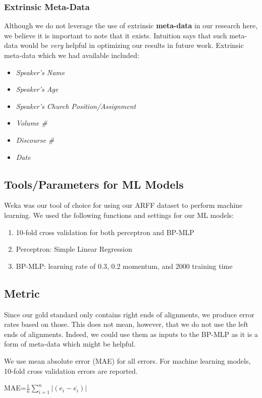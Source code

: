 \subsubsection{Extrinsic Meta-Data}
Although we do not leverage the use of extrinsic \textbf{meta-data} in our research here, we believe it is important to note that it exists. Intuition says that such meta-data would be \textit{very} helpful in optimizing our results in future work. Extrinsic meta-data which we had available included:
	\begin{itemize}
		\item \textit{Speaker's Name}
		\item \textit{Speaker's Age}
		\item \textit{Speaker's Church Position/Assignment}
		\item \textit{Volume \#}
		\item \textit{Discourse \#}
		\item \textit{Date}
	\end{itemize}

\subsection{Tools/Parameters for ML Models}
Weka \cite{weka_2009} was our tool of choice for using our ARFF dataset to perform machine learning. We used the following functions and settings for our ML models:
\begin{enumerate}
	\item 10-fold cross validation for both perceptron and BP-MLP
	\item Perceptron: Simple Linear Regression
	\item BP-MLP: learning rate of 0.3, 0.2 momentum, and 2000 training time
\end{enumerate}

\subsection{Metric}
Since our gold standard only contains right ends of alignments, we produce error rates based on those. This does not mean, however, that we do not use the left ends of alignments. Indeed, we could use them as inputs to the BP-MLP as it is a form of meta-data which might be helpful.

We use mean absolute error (MAE) for all errors. For machine learning models, 10-fold cross validation errors are reported.

\begin{center}
	MAE=$\frac{1}{n}\sum_{i=1}^{n}{|(e_i-\overline{e_i})|}$
\end{center}

